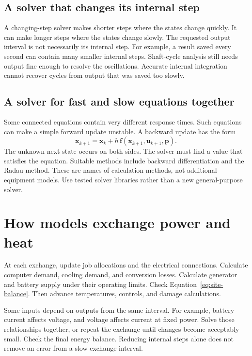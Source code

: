 \documentclass[11pt,a4paper]{report}
\begin{document}
\subsection{A solver that changes its internal step}
A changing-step solver makes shorter steps where the states change quickly.
It can make longer steps where the states change slowly.
The requested output interval is not necessarily its internal step.
For example, a result saved every second can contain many smaller internal steps.
Shaft-cycle analysis still needs output fine enough to resolve the oscillations.
Accurate internal integration cannot recover cycles from output that was saved too slowly.

\subsection{A solver for fast and slow equations together}
Some connected equations contain very different response times.
Such equations can make a simple forward update unstable.
A backward update has the form
\begin{equation}
\mathbf{x}_{k+1}=\mathbf{x}_k+
h\,\mathbf{f}(\mathbf{x}_{k+1},\mathbf{u}_{k+1},\mathbf{p}).
\end{equation}
The unknown next state occurs on both sides.
The solver must find a value that satisfies the equation.
Suitable methods include backward differentiation and the Radau method.
These are names of calculation methods, not additional equipment models.
Use tested solver libraries rather than a new general-purpose solver.

\section{How models exchange power and heat}
At each exchange, update job allocations and the electrical connections.
Calculate computer demand, cooling demand, and conversion losses.
Calculate generator and battery supply under their operating limits.
Check Equation~\ref{eq:site-balance}.
Then advance temperatures, controls, and damage calculations.

Some inputs depend on outputs from the same interval.
For example, battery current affects voltage, and voltage affects current at fixed power.
Solve those relationships together, or repeat the exchange until changes become acceptably small.
Check the final energy balance.
Reducing internal steps alone does not remove an error from a slow exchange interval.
\end{document}
